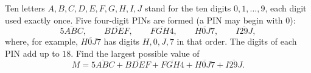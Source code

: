 Ten letters $A,B,C,D,E,F,G,H,I,J$ stand for the ten digits $0,1,\dots,9$, each digit used exactly once. Five four-digit PINs are formed (a PIN may begin with $0$):
\[\overline{5ABC},\qquad\overline{BDEF},\qquad\overline{FGH4},\qquad\overline{H0J7},\qquad\overline{I29J},\]
where, for example, $\overline{H0J7}$ has digits $H,0,J,7$ in that order. The digits of each PIN add up to $18$. Find the largest possible value of
\[M=\overline{5ABC}+\overline{BDEF}+\overline{FGH4}+\overline{H0J7}+\overline{I29J}.\]
